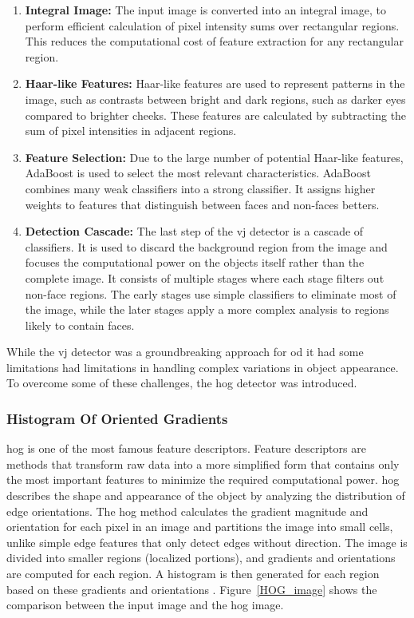 \begin{enumerate}
    \item \textbf{Integral Image:}
    The input image is converted into an integral image, to perform efficient calculation of pixel intensity sums over rectangular regions. This reduces the computational cost of feature extraction for any rectangular region.
    
    \item \textbf{Haar-like Features:}  
    Haar-like features are used to represent patterns in the image, such as contrasts between bright and dark regions, such as darker eyes compared to brighter cheeks. These features are calculated by subtracting the sum of pixel intensities in adjacent regions.
    
    \item \textbf{Feature Selection:}  
    Due to the large number of potential Haar-like features, AdaBoost is used to select the most relevant characteristics. AdaBoost combines many weak classifiers into a strong classifier. It assigns higher weights to features that distinguish between faces and non-faces betters.

    \item \textbf{Detection Cascade:}  
    The last step of the \gls{vj} detector is a cascade of classifiers. It is used to discard the background region from the image and focuses the computational power on the objects itself rather than the complete image. It consists of multiple stages where each stage filters out non-face regions. The early stages use simple classifiers to eliminate most of the image, while the later stages apply a more complex analysis to regions likely to contain faces.

\end{enumerate}

While the \gls{vj} detector was a groundbreaking approach for \gls{od} it had some limitations had limitations in handling complex variations in object appearance. To overcome some of these challenges, the \gls{hog} detector was introduced.

\subsubsection{Histogram Of Oriented Gradients}
 \gls{hog} is one of the most famous feature descriptors. Feature descriptors are methods that transform raw data into a more simplified form that contains only the most important features to minimize the required computational power. \gls{hog} describes the shape and appearance of the object by analyzing the distribution of edge orientations. The \gls{hog} method calculates the gradient magnitude and orientation for each pixel in an image and partitions the image into small cells, unlike simple edge features that only detect edges without direction. The image is divided into smaller regions (localized portions), and gradients and orientations are computed for each region. A histogram is then generated for each region based on these gradients and orientations \cite{HOG}. Figure~\ref{HOG_image} shows the comparison between the input image and the \gls{hog} image.
 
